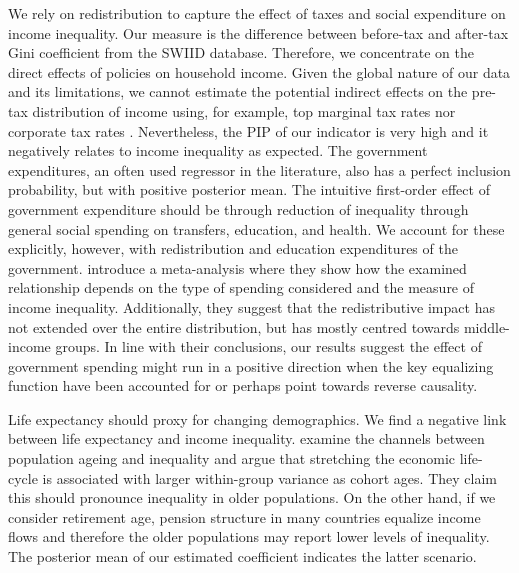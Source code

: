 \begin{refsection}
  We rely on redistribution to capture the effect of taxes and social expenditure on income inequality. Our measure is the difference between before-tax and after-tax Gini coefficient from the \ac{SWIID} database. Therefore, we concentrate on the direct effects of policies on household income. Given the global nature of our data and its limitations, we cannot estimate the potential indirect effects on the pre-tax distribution of income using, for example, top marginal tax rates \parencite{alvaredoetal2013} nor corporate tax rates \parencite{fuest2018higher}. Nevertheless, the \ac{PIP} of our indicator is very high and it negatively relates to income inequality as expected. The government expenditures, an often used regressor in the literature, also has a perfect inclusion probability, but with positive posterior mean. The intuitive first-order effect of government expenditure should be through reduction of inequality through general social spending on transfers, education, and health. We account for these explicitly, however, with redistribution and education expenditures of the government. \textcite{anderson2017does} introduce a meta-analysis where they show how the examined relationship depends on the type of spending considered and the measure of income inequality. Additionally, they suggest that the redistributive impact has not extended over the entire distribution, but has mostly centred towards middle-income groups. In line with their conclusions, our results suggest the effect of government spending might run in a positive direction when the key equalizing function have been accounted for or perhaps point towards reverse causality.
  
  Life expectancy should proxy for changing demographics. We find a negative link between life expectancy and income inequality. \textcite{goldsteinlee2014} examine the channels between population ageing and inequality and argue that stretching the economic life-cycle is associated with larger within-group variance as cohort ages. They claim this should pronounce inequality in older populations. On the other hand, if we consider retirement age, pension structure in many countries equalize income flows and therefore the older populations may report lower levels of inequality. The posterior mean of our estimated coefficient indicates the latter scenario.
  

\end{refsection}
